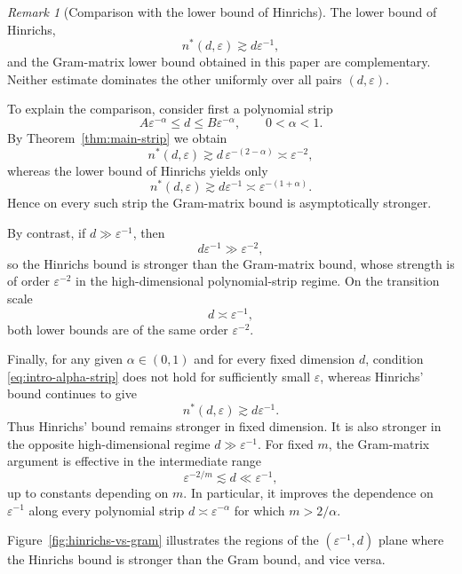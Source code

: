\documentclass[11pt]{article}
\theoremstyle{plain}
\theoremstyle{remark}
\newtheorem{remark}[theorem]{Remark}
\theoremstyle{definition}
\newcommand{\1}{\mathbf{1}}
\begin{document}
\begin{remark}[Comparison with the lower bound of Hinrichs]\label{rem:comparison-hinrichs-gram}
The lower bound of Hinrichs,
\[
 n^{\ast}(d,\varepsilon)\gtrsim d\varepsilon^{-1},
\]
and the Gram-matrix lower bound obtained in this paper are complementary.  Neither estimate dominates the other uniformly over all pairs \((d,\varepsilon)\).

To explain the comparison, consider first a polynomial strip
\[
 A\varepsilon^{-\alpha}\le d\le B\varepsilon^{-\alpha},
 \qquad 0<\alpha<1.
\]
By Theorem~\ref{thm:main-strip} we obtain
\[
 n^{\ast}(d,\varepsilon)\gtrsim d\,\varepsilon^{-(2-\alpha)}
 \asymp \varepsilon^{-2},
\]
whereas the lower bound of Hinrichs yields only
\[
 n^{\ast}(d,\varepsilon)\gtrsim d\varepsilon^{-1}
 \asymp \varepsilon^{-(1+\alpha)}.
\]
Hence on every such strip the Gram-matrix bound is asymptotically stronger.

By contrast, if \(d\gg \varepsilon^{-1}\), then
\[
 d\varepsilon^{-1}\gg \varepsilon^{-2},
\]
so the Hinrichs bound is stronger than the Gram-matrix bound, whose strength is of order \(\varepsilon^{-2}\) in the high-dimensional polynomial-strip regime.  On the transition scale
\[
 d\asymp \varepsilon^{-1},
\]
both lower bounds are of the same order \(\varepsilon^{-2}\).

Finally, for any given $\alpha \in (0, 1)$ and for every fixed dimension $d$, condition \eqref{eq:intro-alpha-strip} does not hold for sufficiently small \(\varepsilon\), whereas Hinrichs' bound continues to give
\[
 n^{\ast}(d,\varepsilon)\gtrsim d\varepsilon^{-1}.
\]
Thus Hinrichs' bound remains stronger in fixed dimension.  It is also
stronger in the opposite high-dimensional regime \(d\gg\varepsilon^{-1}\).
For fixed \(m\), the Gram-matrix argument is effective in the intermediate
range
\[
 \varepsilon^{-2/m}\lesssim d\ll\varepsilon^{-1},
\]
up to constants depending on \(m\).  In particular, it improves the
dependence on \(\varepsilon^{-1}\) along every polynomial strip
\(d\asymp\varepsilon^{-\alpha}\) for which \(m>2/\alpha\).


Figure~\ref{fig:hinrichs-vs-gram} illustrates the regions of the $(\varepsilon^{-1}, d)$ plane where the Hinrichs bound is stronger than the Gram bound, and vice versa.
\end{remark}
\end{document}
